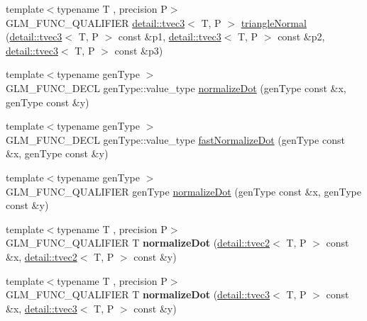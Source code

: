 \begin{DoxyCompactItemize}
\item 
{\footnotesize template$<$typename T , precision P$>$ }\\G\+L\+M\+\_\+\+F\+U\+N\+C\+\_\+\+Q\+U\+A\+L\+I\+F\+I\+ER \hyperlink{structglm_1_1detail_1_1tvec3}{detail\+::tvec3}$<$ T, P $>$ \hyperlink{group__gtx__normal_gadd95b70793270eaeec13e2e8788b71d2}{triangle\+Normal} (\hyperlink{structglm_1_1detail_1_1tvec3}{detail\+::tvec3}$<$ T, P $>$ const \&p1, \hyperlink{structglm_1_1detail_1_1tvec3}{detail\+::tvec3}$<$ T, P $>$ const \&p2, \hyperlink{structglm_1_1detail_1_1tvec3}{detail\+::tvec3}$<$ T, P $>$ const \&p3)
\item 
{\footnotesize template$<$typename gen\+Type $>$ }\\G\+L\+M\+\_\+\+F\+U\+N\+C\+\_\+\+D\+E\+CL gen\+Type\+::value\+\_\+type \hyperlink{group__gtx__normalize__dot_ga13b81f0882c1811cb6c99a5864b9c152}{normalize\+Dot} (gen\+Type const \&x, gen\+Type const \&y)
\item 
{\footnotesize template$<$typename gen\+Type $>$ }\\G\+L\+M\+\_\+\+F\+U\+N\+C\+\_\+\+D\+E\+CL gen\+Type\+::value\+\_\+type \hyperlink{group__gtx__normalize__dot_gaeb26ec35a51c30dbd0d91f9da45eeafe}{fast\+Normalize\+Dot} (gen\+Type const \&x, gen\+Type const \&y)
\item 
{\footnotesize template$<$typename gen\+Type $>$ }\\G\+L\+M\+\_\+\+F\+U\+N\+C\+\_\+\+Q\+U\+A\+L\+I\+F\+I\+ER gen\+Type \hyperlink{group__gtx__normalize__dot_ga13b81f0882c1811cb6c99a5864b9c152}{normalize\+Dot} (gen\+Type const \&x, gen\+Type const \&y)
\item 
{\footnotesize template$<$typename T , precision P$>$ }\\G\+L\+M\+\_\+\+F\+U\+N\+C\+\_\+\+Q\+U\+A\+L\+I\+F\+I\+ER T {\bfseries normalize\+Dot} (\hyperlink{structglm_1_1detail_1_1tvec2}{detail\+::tvec2}$<$ T, P $>$ const \&x, \hyperlink{structglm_1_1detail_1_1tvec2}{detail\+::tvec2}$<$ T, P $>$ const \&y)\hypertarget{namespaceglm_a57fabe89311600d86b489bf9d2ebdd67}{}\label{namespaceglm_a57fabe89311600d86b489bf9d2ebdd67}

\item 
{\footnotesize template$<$typename T , precision P$>$ }\\G\+L\+M\+\_\+\+F\+U\+N\+C\+\_\+\+Q\+U\+A\+L\+I\+F\+I\+ER T {\bfseries normalize\+Dot} (\hyperlink{structglm_1_1detail_1_1tvec3}{detail\+::tvec3}$<$ T, P $>$ const \&x, \hyperlink{structglm_1_1detail_1_1tvec3}{detail\+::tvec3}$<$ T, P $>$ const \&y)\hypertarget{namespaceglm_ace07e8c0834217ad8e5e025247f17df5}{}\label{namespaceglm_ace07e8c0834217ad8e5e025247f17df5}


\end{DoxyCompactItemize}
